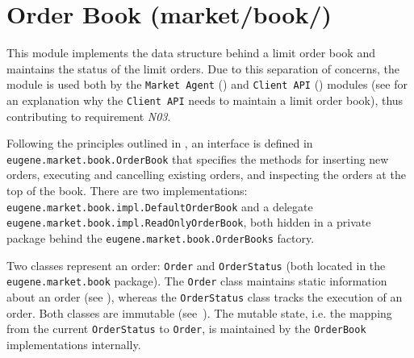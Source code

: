 \section{Order Book (market/book/)}
\label{Chapters/Implementation/Order-Book}
This module implements the data structure behind a limit order book and maintains the status of the limit orders. Due to this separation of concerns, the module is used both by the \texttt{Market~Agent} () and \texttt{Client~API} () modules (see  for an explanation why the \texttt{Client~API} needs to maintain a limit order book), thus contributing to requirement \textit{N03}.

Following the principles outlined in , an interface is defined in \\ \texttt{eugene.market.book.OrderBook} that specifies the methods for inserting new orders, executing and cancelling existing orders, and inspecting the orders at the top of the book. There are two implementations: \texttt{eugene.market.book.impl.DefaultOrderBook} and a delegate \texttt{eugene.market.book.impl.ReadOnlyOrderBook}, both hidden in a private package behind the \texttt{eugene.market.book.OrderBooks} factory.  

Two classes represent an order: \texttt{Order} and \texttt{OrderStatus} (both located in the \texttt{eugene.market.book} package). The \texttt{Order} class maintains static information about an order (see ), whereas the \texttt{OrderStatus} class tracks the execution of an order. Both classes are immutable (see~). The mutable state, i.e. the mapping from the current \texttt{OrderStatus} to \texttt{Order}, is maintained by the \texttt{OrderBook} implementations internally.

